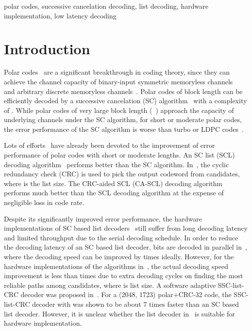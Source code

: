 \documentclass[journal]{IEEEtran}
\begin{document}
\begin{keywords}
polar codes, successive cancelation decoding, list decoding, hardware implementation, low latency decoding
\end{keywords}

\section{Introduction}
\label{sec:intro}

Polar codes~\cite{arikan} are a significant breakthrough in coding theory, since they can achieve the channel capacity of binary-input symmetric memoryless channels~\cite{arikan} and arbitrary discrete memoryless channels~\cite{sas_polar}. Polar codes of block length  can be efficiently decoded by a successive cancelation (SC) algorithm~\cite{arikan} with a complexity of . While polar codes of very large block length (~\cite{gross_polar1}) approach the capacity of underlying channels under the SC algorithm, for short or moderate polar codes, the error performance of the SC algorithm is worse than turbo or LDPC codes~\cite{ido_it}.

Lots of efforts~\cite{ido_it, list2, list3} have already been devoted to the improvement of error performance of polar codes with short or moderate lengths. An SC list (SCL) decoding algorithm~\cite{ido_it} performs better than the SC algorithm. In~\cite{ido_it,list2, list3}, the cyclic redundancy check (CRC) is used to pick the output codeword from  candidates, where  is the list size. The CRC-aided SCL (CA-SCL) decoding algorithm performs much better than the SCL decoding algorithm at the expense of negligible loss in code rate.


Despite its significantly improved error performance, the hardware implementations of SC based list decoders~\cite{tree_list_dec, jun_low_mem_list, yuan_llr, llr_list_tsp, llr_list} still suffer from long decoding latency and limited throughput due to the serial decoding schedule.
In order to reduce the decoding latency of an SC based list decoder,    bits are decoded in parallel in~\cite{bin_polar, yuan_low_latency, chenrong_tsp}, where the decoding speed can be improved by  times ideally. However, for the hardware implementations of the algorithms in~\cite{bin_polar, yuan_low_latency, chenrong_tsp}, the actual decoding speed improvement is less than  times due to extra decoding cycles on finding the  most reliable paths among  candidates, where  is list size.
A software adaptive SSC-list-CRC decoder was proposed in~\cite{gabi_low_latency}. For a (2048, 1723) polar+CRC-32 code, the SSC-list-CRC decoder with  was shown to be about 7 times faster than an SC based list decoder. However, it is unclear whether the list decoder in~\cite{gabi_low_latency} is suitable for hardware implementation.
\end{document}
